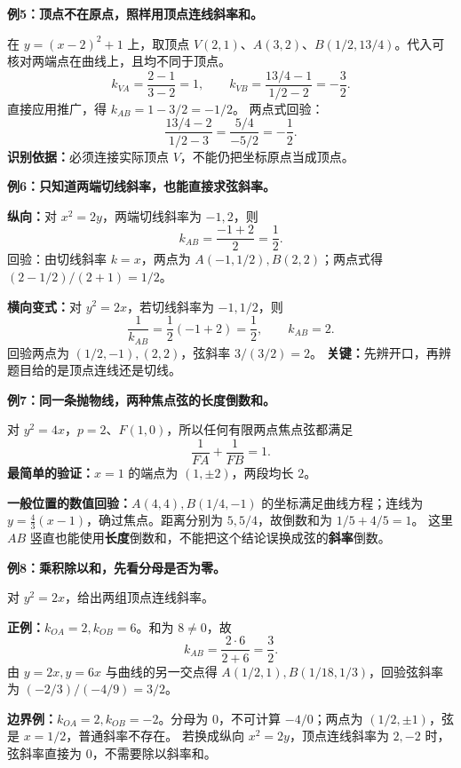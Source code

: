\clearpage
\begin{examplebox}
\textbf{例5：顶点不在原点，照样用顶点连线斜率和。}
\begin{center}\end{center}
在 $y=(x-2)^2+1$ 上，取顶点 $V(2,1)$、$A(3,2)$、$B(1/2,13/4)$。代入可核对两端点在曲线上，且均不同于顶点。
\[
k_{VA}=\frac{2-1}{3-2}=1,\qquad
k_{VB}=\frac{13/4-1}{1/2-2}=-\frac32.
\]
直接应用推广，得 $\boxed{k_{AB}=1-3/2=-1/2}$。
两点式回验：
\[
\frac{13/4-2}{1/2-3}=\frac{5/4}{-5/2}=-\frac12.
\]
\textbf{识别依据：}必须连接实际顶点 $V$，不能仍把坐标原点当成顶点。
\end{examplebox}

\clearpage
\begin{examplebox}
\textbf{例6：只知道两端切线斜率，也能直接求弦斜率。}
\begin{center}\end{center}
\textbf{纵向：}对 $x^2=2y$，两端切线斜率为 $-1,2$，则
\[
\boxed{k_{AB}=\frac{-1+2}{2}=\frac12}.
\]
回验：由切线斜率 $k=x$，两点为 $A(-1,1/2),B(2,2)$；两点式得 $(2-1/2)/(2+1)=1/2$。

\textbf{横向变式：}对 $y^2=2x$，若切线斜率为 $-1,1/2$，则
\[
\frac1{k_{AB}}=\frac12\left(-1+2\right)=\frac12,
\qquad\boxed{k_{AB}=2}.
\]
回验两点为 $(1/2,-1),(2,2)$，弦斜率 $3/(3/2)=2$。
\textbf{关键：}先辨开口，再辨题目给的是顶点连线还是切线。
\end{examplebox}

\clearpage
\begin{examplebox}
\textbf{例7：同一条抛物线，两种焦点弦的长度倒数和。}
\begin{center}\end{center}
对 $y^2=4x$，$p=2$、$F(1,0)$，所以任何有限两点焦点弦都满足
\[
\boxed{\frac1{FA}+\frac1{FB}=1}.
\]
\textbf{最简单的验证：}$x=1$ 的端点为 $(1,\pm2)$，两段均长 $2$。

\textbf{一般位置的数值回验：}$A(4,4),B(1/4,-1)$ 的坐标满足曲线方程；连线为 $y=\frac43(x-1)$，确过焦点。距离分别为 $5,5/4$，故倒数和为 $1/5+4/5=1$。
这里 $AB$ 竖直也能使用\textbf{长度}倒数和，不能把这个结论误换成弦的\textbf{斜率}倒数。
\end{examplebox}

\clearpage
\begin{examplebox}
\textbf{例8：乘积除以和，先看分母是否为零。}
\begin{center}\end{center}
对 $y^2=2x$，给出两组顶点连线斜率。

\textbf{正例：}$k_{OA}=2,k_{OB}=6$。和为 $8\ne0$，故
\[
\boxed{k_{AB}=\frac{2\cdot6}{2+6}=\frac32}.
\]
由 $y=2x,y=6x$ 与曲线的另一交点得 $A(1/2,1),B(1/18,1/3)$，回验弦斜率为 $(-2/3)/(-4/9)=3/2$。

\textbf{边界例：}$k_{OA}=2,k_{OB}=-2$。分母为 $0$，不可计算 $-4/0$；两点为 $(1/2,\pm1)$，弦是 $x=1/2$，普通斜率不存在。
若换成纵向 $x^2=2y$，顶点连线斜率为 $2,-2$ 时，弦斜率直接为 $0$，不需要除以斜率和。
\end{examplebox}

